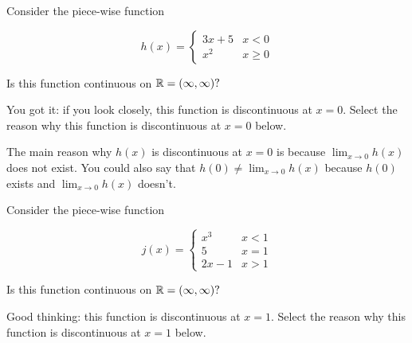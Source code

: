\documentclass[handout]{ximera}
\begin{document}
\begin{exercise}
Consider the piece-wise function 

\[
h(x) = \begin{cases}
  3x+5  & x<0 \\
  x^2 & x \geq 0
\end{cases}
\]

Is this function continuous on $\mathbb R = (\infty, \infty)?$  

\begin{multipleChoice}
\end{multipleChoice}

\begin{exercise}

You got it: if you look closely, this function is discontinuous at $x=0$.  Select the reason why this function is discontinuous at $x=0$ below.  

\begin{multipleChoice}
    
\begin{feedback}[correct]
The main reason why $h(x)$ is discontinuous at $x=0$ is because $\displaystyle\lim_{x \to 0} h(x)$ does not exist.  You could also say that $h(0) \neq \displaystyle\lim_{x \to 0} h(x)$ because $h(0)$ exists and $\displaystyle\lim_{x \to 0} h(x)$ doesn't.
\end{feedback}

\end{multipleChoice}

\begin{exercise}
Consider the piece-wise function 

\[
j(x) = \begin{cases}
  x^3  & x < 1 \\
  5 & x=1 \\
  2x-1 & x > 1
\end{cases}
\]

Is this function continuous on $\mathbb R = (\infty, \infty)?$  

\begin{multipleChoice}
\end{multipleChoice}

\begin{exercise}

Good thinking: this function is discontinuous at $x=1$.  Select the reason why this function is discontinuous at $x=1$ below.


\end{exercise}
\end{exercise}
\end{exercise}
\end{exercise}
\end{document}

